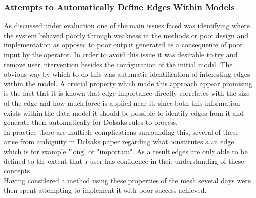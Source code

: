\subsubsection{Attempts to Automatically Define Edges Within Models}
As discussed under evaluation one of the main issues faced was identifying where the system behaved poorly through weakness in the methods or poor design and implementation as opposed to poor output generated as a consequence of poor input by the operator. In order to avoid this issue it was desirable to try and remove user intervention besides the configuration of the initial model. The obvious way by which to do this was automatic identification of interesting edges within the model. A crucial property which made this approach appear promising is the fact that it is known that edge importance directly correlates with the size of the edge and how much force is applied near it, since both this information exists within the data model it should be possible to identify edges from it and generate them automatically for Dolsaks rules to process.  \\


\noindent
In practice there are multiple complications surrounding this, several of these arise from ambiguity in Dolsaks paper regarding what constitutes a an edge which is for example "long" or "important". As a result edges are only able to be defined to the extent that a user has confidence in their understanding of these concepts. \\ 


Having considered a method using these properties of the mesh several days were then spent attempting to implement it with poor success achieved.

